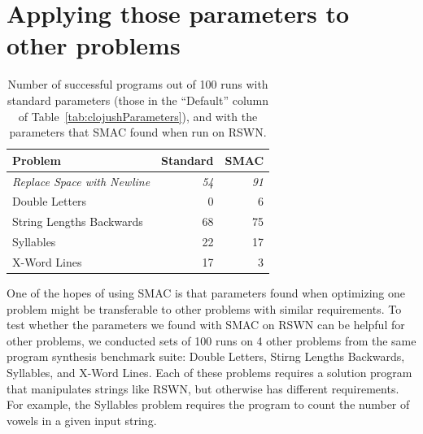 
\section{Applying those parameters to other problems}
\label{sec:applyingToOtherProblems}

%
%

\begin{table}[t]
\centering
\caption{Number of successful programs out of 100 runs with standard parameters (those in the ``Default'' column of Table~\ref{tab:clojushParameters}), and with the parameters that SMAC found when run on RSWN.}
\label{table:results}
\begin{tabular}{l r r}
\toprule
\textbf{Problem} & \textbf{Standard} & \textbf{SMAC} \tabularnewline
\midrule
\textit{Replace Space with Newline} & \textit{54} & \textit{91} \tabularnewline
Double Letters	& 0 & 6 \tabularnewline
String Lengths Backwards & 68 & 75 \tabularnewline
Syllables & 22 & 17 \tabularnewline
X-Word Lines & 17 & 3 \tabularnewline
\bottomrule
\end{tabular}
\end{table}

One of the hopes of using SMAC is that parameters found when optimizing one problem might be transferable to other problems with similar requirements. To test whether the parameters we found with SMAC on RSWN can be helpful for other problems, we conducted sets of 100 runs on 4 other problems from the same program synthesis benchmark suite: Double Letters, Stirng Lengths Backwards, Syllables, and X-Word Lines. Each of these problems requires a solution program that manipulates strings like RSWN, but otherwise has different requirements. For example, the Syllables problem requires the program to count the number of vowels in a given input string.

